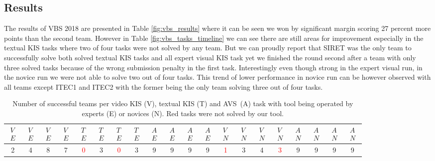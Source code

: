 \subsection{Results}
The results of VBS 2018 are presented in Table \ref{fig:vbs_results} where it can be seen we won by significant margin scoring 27 percent more points than the second team. However in Table \ref{fig:vbs_tasks_timeline} we can see there are still areas for improvement especially in the textual KIS tasks where two of four tasks were not solved by any team. But we can proudly report that SIRET was the only team to successfully solve both solved textual KIS tasks and all expert visual KIS task yet we finished the round second after a team with only three solved tasks because of the wrong submission penalty in the first task. Interestingly even though strong in the expert visual run, in the novice run we were not able to solve two out of four tasks. This trend of lower performance in novice run can be however observed with all teams except ITEC1 and ITEC2 with the former being the only team solving three out of four tasks.

\begin{table}[h]
	
	\centering
	\begin{tabular}{cccc|cccc|cccc|cccc|cccc}
		\toprule
		$\substack{V \\ E}$ & $\substack{V \\ E}$ & $\substack{V \\ E}$ & $\substack{V \\ E}$ & $\substack{T \\ E}$ & $\substack{T \\ E}$ & $\substack{T \\ E}$ & $\substack{T \\ E}$ & $\substack{A \\ E}$ & $\substack{A \\ E}$ & $\substack{A \\ E}$ & $\substack{A \\ E}$ & $\substack{V \\ N}$ & $\substack{V \\ N}$ & $\substack{V \\ N}$ & $\substack{V \\ N}$ & $\substack{A \\ N}$ & $\substack{A \\ N}$ & $\substack{A \\ N}$ & $\substack{A \\ N}$ \\
		\midrule
		2 & 4 & 8 & 7 & \textcolor{red}{0} & 3 & \textcolor{red}{0} & 3 & 9 & 9 & 9 & 9 & \textcolor{red}{1} & 3 & 4 & \textcolor{red}{3} & 9 & 9 & 9 & 9 \\
		\bottomrule
	\end{tabular}
	
	\caption[Number of successful teams per task at VBS 2018]{Number of successful teams per video KIS (V), textual KIS (T) and AVS~(A) task with tool being operated by experts (E) or novices (N). Red tasks were not solved by our tool.}
	\label{fig:vbs_tasks}
\end{table}


